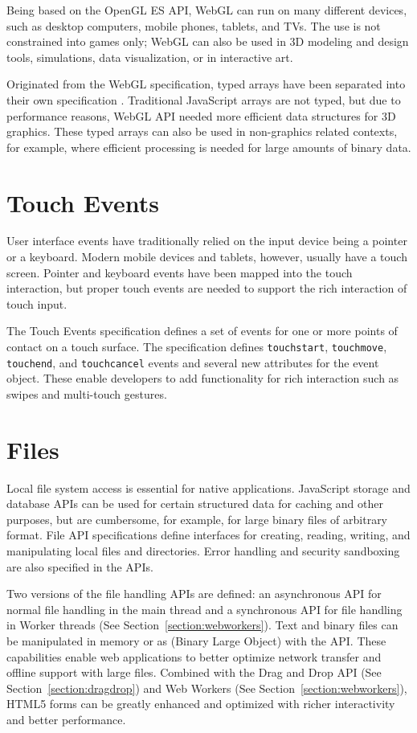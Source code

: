 Being based on the OpenGL ES API, WebGL can run on many different
devices, such as desktop computers, mobile phones, tablets, and
TVs. The use is not constrained into games only; WebGL can also be
used in 3D modeling and design tools, simulations, data visualization,
or in interactive art.

Originated from the WebGL specification, typed arrays have been
separated into their own specification \cite{TypedArrays}. Traditional
JavaScript arrays are not typed, but due to performance reasons, WebGL
API needed more efficient data structures for 3D graphics. These typed
arrays can also be used in non-graphics related contexts, for example,
where efficient processing is needed for large amounts of binary data.

\section{Touch Events}

User interface events have traditionally relied on the input device
being a pointer or a keyboard. Modern mobile devices and tablets,
however, usually have a touch screen. Pointer and keyboard events have
been mapped into the touch interaction, but proper touch events are
needed to support the rich interaction of touch input.

The Touch Events specification \cite{touchevents} defines a set of
events for one or more points of contact on a touch surface. The
specification defines \texttt{touchstart}, \texttt{touchmove},
\texttt{touchend}, and \texttt{touchcancel} events and several new
attributes for the event object. These enable developers to add
functionality for rich interaction such as swipes and multi-touch
gestures.

\section{Files}
\label{section:fileapi}

Local file system access is essential for native
applications. JavaScript storage and database APIs can be used for
certain structured data for caching and other purposes, but are
cumbersome, for example, for large binary files of arbitrary
format. File API specifications \cite{FileAPI, FileAPIWriter,
  FileAPIDir} define interfaces for creating, reading, writing, and
manipulating local files and directories. Error handling and security
sandboxing are also specified in the APIs.

Two versions of the file handling APIs are defined: an asynchronous
API for normal file handling in the main thread and a synchronous API
for file handling in Worker threads (See
Section~\ref{section:webworkers}). Text and binary files can be
manipulated in memory or as  (Binary Large Object)
 with the  API. These capabilities enable web
applications to better optimize network transfer and offline support
with large files. Combined with the Drag and Drop API (See
Section~\ref{section:dragdrop}) and Web Workers (See
Section~\ref{section:webworkers}), HTML5 forms can be greatly enhanced
and optimized with richer interactivity and better performance.

